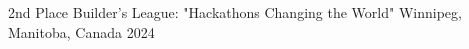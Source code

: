

\begin{cvhonors}

  \cvhonor
  {2nd Place} %
  {Builder's League: "Hackathons Changing the World"} %
  {Winnipeg, Manitoba, Canada} %
  {2024} %




\end{cvhonors}







